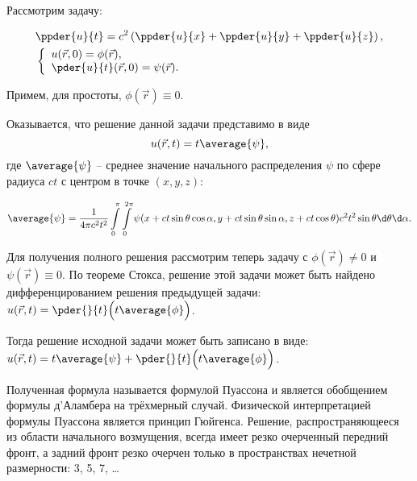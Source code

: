 
Рассмотрим задачу:

\begin{minipage}{.33\textwidth}
    \begin{align*}
        & \ppder{u}{t} =
        c^2\left(\ppder{u}{x} + \ppder{u}{y} + \ppder{u}{z}\right), \\
        & \left\{ \begin{array}{l}
            u(\vec{r}, 0) = \phi(\vec{r}), \\
            \ds \pder{u}{t}(\vec{r}, 0) = \psi(\vec{r}).
        \end{array} \right.
    \end{align*}
\end{minipage}
\hfill
\begin{minipage}{.6\textwidth}
    Примем, для простоты, \( \phi(\vec{r}) \equiv 0 \).
    
    Оказывается, что решение данной задачи представимо в виде
    \[
        u(\vec{r}, t) = t\average{\psi},
    \]
    где \( \average{\psi} \) -- среднее значение начального распределения
    \( \psi \) по сфере радиуса \( ct \) с центром в точке \( (x, y, z) \):
\end{minipage}
\[
    \average{\psi} = \frac{1}{4\pi c^2t^2} \int\limits_0^\pi
    \int\limits_0^{2\pi} \psi(x + ct\sin\theta\cos\alpha, y + ct\sin\theta
    \sin\alpha, z + ct\cos\theta)c^2t^2\sin\theta\d\theta\d\alpha.
\]

Для получения полного решения рассмотрим теперь задачу с
\( \phi(\vec{r}) \neq 0 \) и \( \psi(\vec{r}) \equiv 0 \). По теореме Стокса,
решение этой задачи может быть найдено дифференцированием решения предыдущей
задачи: \( \ds u(\vec{r}, t) = \pder{}{t}\Bigl(t\average{\phi}\Bigr) \).

Тогда решение исходной задачи может быть записано в виде:
\( \ds u(\vec{r}, t) = t\average{\psi} + \pder{}{t}\Bigl(t\average{\phi}\Bigr) \).

Полученная формула называется формулой Пуассона и является обобщением формулы
д'Аламбера на трёхмерный случай. Физической интерпретацией формулы Пуассона
является принцип Гюйгенса. Решение, распространяющееся из области начального
возмущения, всегда имеет резко очерченный передний фронт, а задний фронт резко
очерчен только в пространствах нечетной размерности: 3, 5, 7, \ldots


